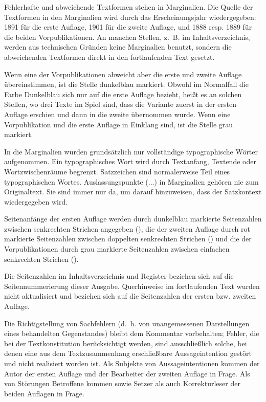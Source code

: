 Fehlerhafte und abweichende Textformen stehen in Marginalien. Die Quelle der Textformen in den Marginalien wird durch das Erscheinungsjahr wiedergegeben: 1891 für die erste Auflage, 1901 für die zweite Auflage, und 1888 resp. 1889 für die beiden Vorpublikationen. An manchen Stellen, z.~B. im Inhaltsverzeichnis, werden aus technischen Gründen keine Marginalien benutzt, sondern die abweichenden Textformen direkt in den fortlaufenden Text gesetzt.

Wenn eine der Vorpublikationen abweicht aber die erste und zweite Auflage übereinstimmen, ist die Stelle dunkelblau markiert. Obwohl im Normalfall die Farbe Dunkelblau sich nur auf die erste Auflage bezieht, heißt es an solchen Stellen, wo drei Texte im Spiel sind, dass die Variante zuerst in der ersten Auflage erschien und dann in die zweite übernommen wurde. Wenn eine Vorpublikation und die erste Auflage in Einklang sind, ist die Stelle grau markiert.

In die Marginalien wurden grundsätzlich nur vollständige typographische Wörter aufgenommen. Ein ty­pographisches Wort wird durch Textanfang, Textende oder Wortzwischenräume begrenzt. Satzzeichen sind normalerweise Teil eines typographischen Wortes. Auslassungspunkte (...) in Marginalien gehören nie zum Originaltext. Sie sind immer nur da, um darauf hinzuweisen, dass der Satzkontext wiedergegeben wird.

Seitenanfänge der ersten Auflage werden durch dunkelblau markierte Seitenzahlen zwischen senkrechten Strichen angegeben (), die der zweiten Auflage durch rot markierte Seitenzahlen zwischen doppelten senkrechten Strichen () und die der Vorpublikationen durch grau markierte Seitenzahlen zwischen einfachen senkrechten Strichen ().

Die Seitenzahlen im Inhaltsverzeichnis und Register beziehen sich auf die Seitennummerierung dieser Ausgabe. Querhinweise im fortlaufenden Text wurden nicht aktualisiert und beziehen sich auf die Seitenzahlen der ersten bzw. zweiten Auflage.

Die Richtigstellung von Sachfehlern (d.~h. von unangemessenen Darstellungen eines behandelten Gegenstandes) bleibt dem Kommentar vorbehalten; Fehler, die bei der Textkonstitution berücksichtigt werden, sind ausschließlich solche, bei denen eine aus dem Textzusammenhang erschließbare Aus­sageintention gestört und nicht realisiert worden ist. Als Subjekte von Aussageintentionen kommen der Autor der ersten Auflage und der Bearbeiter der zweiten Auflage in Frage. Als von Störungen Betroffene kommen sowie Setzer als auch Korrekturleser der beiden Auflagen in Frage.

